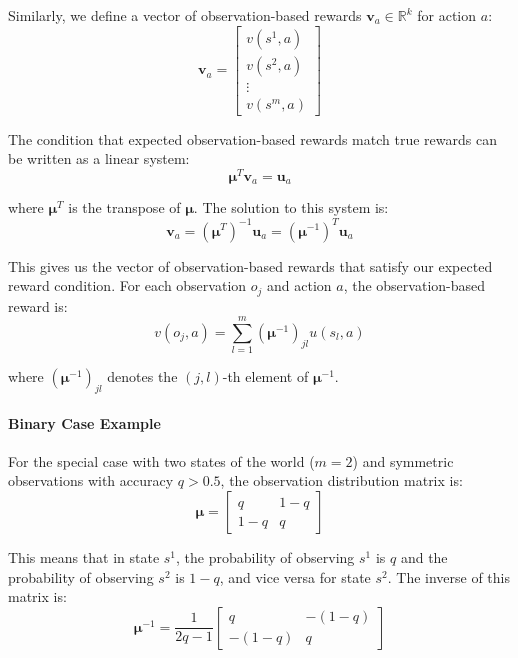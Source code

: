 \documentclass[a4paper,12pt]{report}
\begin{document}
Similarly, we define a vector of observation-based rewards $\bm{v}_{a} \in \mathbb{R}
    ^{k}$ for action $a$:
\begin{equation}
    \bm{v}_{a} =
    \begin{bmatrix}
        v(s^{1}, a) \\
        v(s^{2}, a) \\
        \vdots      \\
        v(s^{m}, a)
    \end{bmatrix}
\end{equation}

The condition that expected observation-based rewards match true rewards can be written
as a linear system:
\begin{equation}
    \bm{\mu}^{T} \bm{v}_{a} = \bm{u}_{a}
\end{equation}

where $\bm{\mu}^{T}$ is the transpose of $\bm{\mu}$. The solution to this system
is:
\begin{equation}
    \bm{v}_{a} = (\bm{\mu}^{T})^{-1}\bm{u}_{a} = (\bm{\mu}^{-1})^{T} \bm{u}_{a}
\end{equation}

This gives us the vector of observation-based rewards that satisfy our expected
reward condition. For each observation $o_{j}$ and action $a$, the observation-based
reward is:
\begin{equation}
    v(o_{j}, a) = \sum_{l=1}^{m} \left( \bm{\mu}^{-1}\right)_{jl}u(s_{l}, a)
\end{equation}

where $\left( \bm{\mu}^{-1}\right)_{jl}$ denotes the $(j, l)$-th element of
$\bm{\mu}^{-1}$.
\paragraph{Binary Case Example}
For the special case with two states of the world ($m = 2$) and symmetric
observations with accuracy $q > 0.5$, the observation distribution matrix is:
\begin{equation}
    \bm{\mu}=
    \begin{bmatrix}
        q   & 1-q \\
        1-q & q
    \end{bmatrix}
\end{equation}

This means that in state $s^{1}$, the probability of observing $s^{1}$ is $q$
and the probability of observing $s^{2}$ is $1-q$, and vice versa for state $s^{2}$.
The inverse of this matrix is:
\begin{equation}
    \bm{\mu}^{-1}= \frac{1}{2q-1}
    \begin{bmatrix}
        q      & -(1-q) \\
        -(1-q) & q
    \end{bmatrix}
\end{equation}
\end{document}
